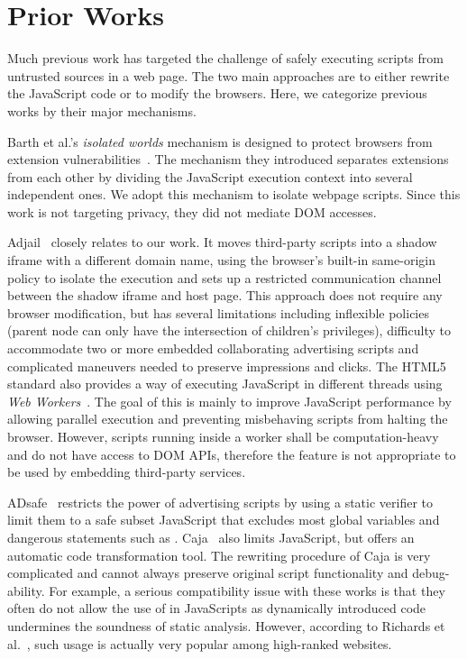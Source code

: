 \section{Prior Works}
\label{sec:esorics_related_works}

Much previous work has targeted the challenge of safely executing scripts from untrusted sources in a web page.  The two main approaches are to either rewrite the JavaScript code or to modify the browsers.  Here, we categorize previous works by their major mechanisms.

 Barth et al.'s \emph{isolated worlds} mechanism is designed to protect browsers from extension vulnerabilities~\cite{extension}.  The mechanism they introduced separates extensions from each other by dividing the JavaScript execution context into several independent ones.  We adopt this mechanism to isolate webpage scripts.  Since this work is not targeting privacy, they did not mediate DOM accesses.  

Adjail~\cite{Adjail} closely relates to our work.  It moves third-party scripts into a shadow iframe with a different domain name, using the browser's built-in same-origin policy to isolate the execution and sets up a restricted communication channel between the shadow iframe and host page.  This approach does not require any browser modification, but has several limitations including inflexible policies (parent node can only have the intersection of children's privileges), difficulty to accommodate two or more embedded collaborating advertising scripts and complicated maneuvers needed to preserve impressions and clicks.  The HTML5 standard also provides a way of executing JavaScript in different threads using \emph{Web Workers}~\cite{WebWorkers}.  The goal of this is mainly to improve JavaScript performance by allowing parallel execution and preventing misbehaving scripts from halting the browser.  However, scripts running inside a worker shall be computation-heavy and do not have access to DOM APIs, therefore the feature is not appropriate to be used by embedding third-party services.  

 ADsafe~\cite{ADsafe} restricts the power of advertising scripts by using a static verifier to limit them to a safe subset JavaScript that excludes most global variables and dangerous statements such as .  Caja~\cite{caja} also limits JavaScript, but offers an automatic code transformation tool.  The rewriting procedure of Caja is very complicated and cannot always preserve original script functionality and debug-ability.  For example, a serious compatibility issue with these works is that they often do not allow the use of  in JavaScripts as dynamically introduced code undermines the soundness of static analysis.  However, according to Richards et al.~\cite{Richards:2010:ADB:1806596.1806598}, such usage is actually very popular among high-ranked websites.

